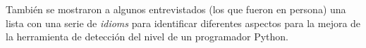 \documentclass[a4paper, 12pt]{book}
\begin{document}
También se mostraron a algunos entrevistados (los que fueron en persona) una lista con una serie de \textit{idioms} para identificar diferentes aspectos para la mejora de la herramienta de detección del nivel de un programador Python.



\cleardoublepage


\end{document}
